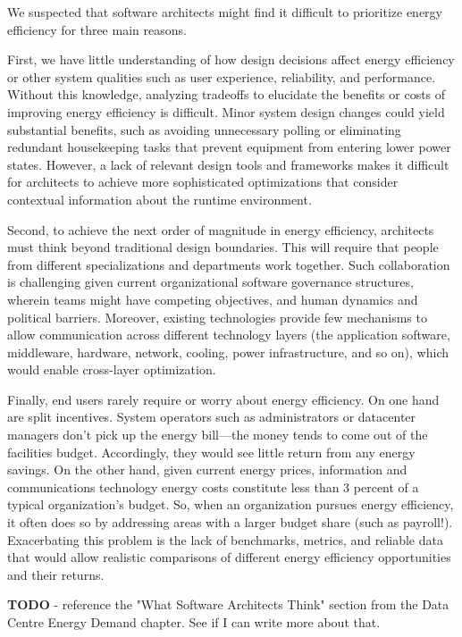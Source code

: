 We suspected that software architects might find it difficult to prioritize energy efficiency for three main reasons. 

First, we have little understanding of how design decisions affect energy efficiency or other system qualities such as user experience, reliability, and performance. Without this knowledge, analyzing tradeoffs to elucidate the benefits or costs of improving energy efficiency is difficult. Minor system design changes could yield substantial benefits, such as avoiding unnecessary polling or eliminating redundant housekeeping tasks that prevent equipment from entering lower power states. However, a lack of relevant design tools and frameworks makes it difficult for architects to achieve more sophisticated optimizations that consider contextual information about the runtime environment.

Second, to achieve the next order of magnitude in energy efficiency, architects must think beyond traditional design boundaries. This will require that people from different specializations and departments work together. Such collaboration is challenging given current organizational software governance structures, wherein teams might have competing objectives, and human dynamics and political barriers. Moreover, existing technologies provide few mechanisms to allow communication across different technology layers (the application software, middleware, hardware, network, cooling, power infrastructure, and so on), which would enable cross-layer optimization.

Finally, end users rarely require or worry about energy efficiency. On one hand are split incentives. System operators such as administrators or datacenter managers don’t pick up the energy bill—the money tends to come out of the facilities budget. Accordingly, they would see little return from any energy savings. On the other hand, given current energy prices, information and communications technology energy costs constitute less than 3 percent of a typical organization’s budget. So, when an organization pursues energy efficiency, it often does so by addressing areas with a larger budget share (such as payroll!). Exacerbating this problem is the lack of benchmarks, metrics, and reliable data that would allow realistic comparisons of different energy efficiency opportunities and their returns.

\textbf{TODO} - reference the "What Software Architects Think" section from the Data Centre Energy Demand chapter.  See if I can write more about that.

